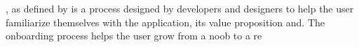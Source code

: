 
, as defined by  is a process designed by developers and designers to help the user familiarize themselves with the application, its value proposition and. The onboarding process helps the user grow from a noob to a re









